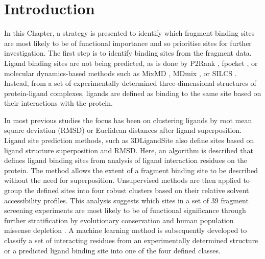 \section{Introduction}


In this Chapter, a strategy is presented to identify which fragment binding sites are most likely to be of functional importance and so prioritise sites for further investigation. The first step is to identify binding sites from the fragment data. Ligand binding sites are not being predicted, as is done by P2Rank \cite{KRIVAK_2018_P2RANK}, fpocket \cite{GUILLOUX_2009_FPOCKET}, or molecular dynamics-based methods such as MixMD \cite{LEXA_2011_FLEXIBILITY, GHANAKOTA_2018_MIXMD}, MDmix \cite{ALVAREZ_2014_MIXMD}, or SILCS \cite{FALLER_2015_SILCS}. Instead, from a set of experimentally determined three-dimensional structures of protein-ligand complexes, ligands are defined as binding to the same site based on their interactions with the protein.

In most previous studies the focus has been on clustering ligands by root mean square deviation (RMSD) \cite{SHIN_2005_PDBLIGAND} or Euclidean distances \cite{KOZAKOV_2005_CLUSTERING} after ligand superposition. Ligand site prediction methods, such as 3DLigandSite \cite{WASS_2010_3DLIGANDSITE, MCGREIG_2022_3DLIGANDSITE} also define sites based on ligand structure superposition and RMSD. Here, an algorithm is described that defines ligand binding sites from analysis of ligand interaction residues on the protein. The method allows the extent of a fragment binding site to be described without the need for superposition. Unsupervised methods are then applied to group the defined sites into four robust clusters based on their relative solvent accessibility profiles. This analysis suggests which sites in a set of 39 fragment screening experiments are most likely to be of functional significance through further stratification by evolutionary conservation and human population missense depletion \cite{MACGOWAN_2017_VARIANTS, MACGOWAN_2024_VARIANTS}. A machine learning method is subsequently developed to classify a set of interacting residues from an experimentally determined structure or a predicted ligand binding site into one of the four defined classes.

